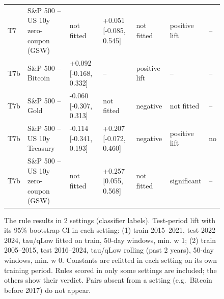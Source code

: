 \begin{figure}[t]
{\begin{tabular}{lllllll}
T7 & S\&P 500 -- US 10y zero-coupon (GSW) & not fitted & +0.051 [-0.085, 0.545] & not fitted & positive lift & -- \\
T7b & S\&P 500 -- Bitcoin & +0.092 [-0.168, 0.332] & -- & positive lift & -- & -- \\
T7b & S\&P 500 -- Gold & -0.060 [-0.307, 0.313] & not fitted & negative & not fitted & -- \\
T7b & S\&P 500 -- US 10y Treasury & -0.114 [-0.341, 0.193] & +0.207 [-0.072, 0.460] & negative & positive lift & no \\
T7b & S\&P 500 -- US 10y zero-coupon (GSW) & not fitted & +0.257 [0.055, 0.568] & not fitted & significant & -- \\
\bottomrule
\end{tabular}
}
\caption{The rule results in 2 settings (classifier labels). Test-period lift with its 95\% bootstrap CI in each setting: (1) train 2015–2021, test 2022–2024, tau/qLow fitted on train, 50-day windows, min. w 1; (2) train 2005–2015, test 2016–2024, tau/qLow rolling (past 2 years), 50-day windows, min. w 0. Constants are refitted in each setting on its own training period. Rules scored in only some settings are included; the others show their verdict. Pairs absent from a setting (e.g.\ Bitcoin before 2017) do not appear.}
\label{fig:robustness_classifier}
\end{figure}
